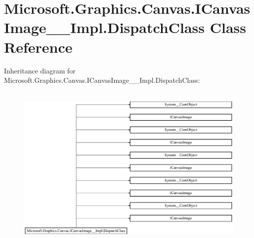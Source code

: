 \hypertarget{class_microsoft_1_1_graphics_1_1_canvas_1_1_i_canvas_image_____impl_1_1_dispatch_class}{}\section{Microsoft.\+Graphics.\+Canvas.\+I\+Canvas\+Image\+\_\+\+\_\+\+Impl.\+Dispatch\+Class Class Reference}
\label{class_microsoft_1_1_graphics_1_1_canvas_1_1_i_canvas_image_____impl_1_1_dispatch_class}
Inheritance diagram for Microsoft.\+Graphics.\+Canvas.\+I\+Canvas\+Image\+\_\+\+\_\+\+Impl.\+Dispatch\+Class\+:\begin{figure}[H]
\begin{center}
\leavevmode
\includegraphics[height=8.148149cm]{class_microsoft_1_1_graphics_1_1_canvas_1_1_i_canvas_image_____impl_1_1_dispatch_class}
\end{center}
\end{figure}
